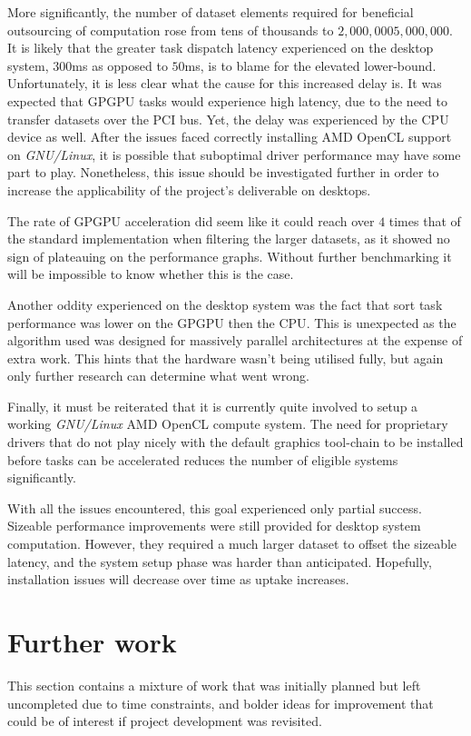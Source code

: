 More significantly, the number of dataset elements required for beneficial outsourcing of computation rose from tens of thousands to $2,000,000$\textendash$5,000,000$. It is likely that the greater task dispatch latency experienced on the desktop system, $300$ms as opposed to $50$ms, is to blame for the elevated lower-bound. Unfortunately, it is less clear what the cause for this increased delay is. It was expected that \ac{GPGPU} tasks would experience high latency, due to the need to transfer datasets over the \ac{PCI} bus. Yet, the delay was experienced by the \ac{CPU} device as well. After the issues faced correctly installing \ac{AMD} \ac{OpenCL} support on \emph{GNU/Linux}, it is possible that suboptimal driver performance may have some part to play. Nonetheless, this issue should be investigated further in order to increase the applicability of the project's deliverable on desktops.

The rate of \ac{GPGPU} acceleration did seem like it could reach over $4$ times that of the standard implementation when filtering the larger datasets, as it showed no sign of plateauing on the performance graphs. Without further benchmarking it will be impossible to know whether this is the case.

Another oddity experienced on the desktop system was the fact that sort task performance was lower on the \ac{GPGPU} then the \ac{CPU}. This is unexpected as the algorithm used was designed for massively parallel architectures at the expense of extra work. This hints that the hardware wasn't being utilised fully, but again only further research can determine what went wrong.

Finally, it must be reiterated that it is currently quite involved to setup a working \emph{GNU/Linux} \ac{AMD} \ac{OpenCL} compute system. The need for proprietary drivers that do not play nicely with the default graphics tool-chain to be installed before tasks can be accelerated reduces the number of eligible systems significantly.

With all the issues encountered, this goal experienced only partial success. Sizeable performance improvements were still provided for desktop system computation. However, they required a much larger dataset to offset the sizeable latency, and the system setup phase was harder than anticipated. Hopefully, installation issues will decrease over time as uptake increases.

\section{Further work}
This section contains a mixture of work that was initially planned but left uncompleted due to time constraints, and bolder ideas for improvement that could be of interest if project development was revisited.

